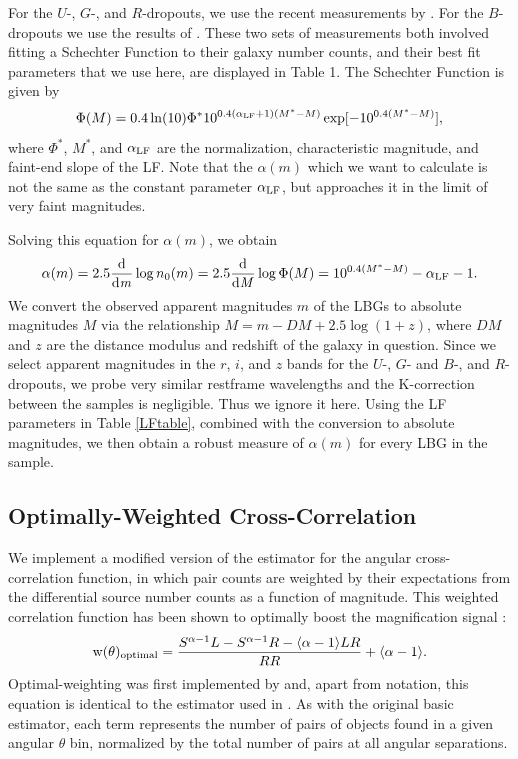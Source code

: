 For the $U$-, $G$-, and $R$-dropouts, we use the recent measurements by \citet{vanderBurg10}. For the $B$-dropouts we use the results of \citet{Sawicki06}. These two sets of measurements both involved fitting a Schechter Function \citep{Schechter76} to their galaxy number counts, and their best fit parameters that we use here, are displayed in Table 1.  The Schechter Function is given by
\begin{equation}
\Phi(M)=0.4\ln(10)\Phi^\ast10^{0.4(\alpha_{\rm LF}+1)(M^\ast-M)} \exp [-10^{0.4(M^\ast-M)}],
\end{equation}
where $\Phi^\ast$, $M^\ast$, and $\alpha_{\rm LF}$ are the normalization, characteristic magnitude, and faint-end slope of the \ac{LF}.  Note that the $\alpha(m)$ which we want to calculate is not the same as the constant parameter $\alpha_{\rm LF}$, but approaches it in the limit of very faint magnitudes.

Solving this equation for $\alpha(m)$, we obtain
\begin{equation}
\alpha(m) = 2.5 \frac{\mathrm d}{\mathrm d \it m} \log n_0(m)= 2.5 \frac{\mathrm d}{\mathrm d \it M} \log \Phi(M) = 10^{0.4(M^\ast-M)}-\alpha_{\rm LF}-1.
\end{equation}
We convert the observed apparent magnitudes $m$ of the \ac{LBG}s to absolute magnitudes $M$ via the relationship $M = m - DM + 2.5 \log (1+z)$, where $DM$ and $z$ are the distance modulus and redshift of the galaxy in question. Since we select apparent magnitudes in the $r$, $i$, and $z$ bands for the $U$-, $G$- and $B$-, and $R$-dropouts, we probe very similar restframe wavelengths and the K-correction between the samples is negligible.  Thus we ignore it here. Using the \ac{LF} parameters in Table \ref{LFtable}, combined with the conversion to absolute magnitudes, we then obtain a robust measure of $\alpha(m)$ for every \ac{LBG} in the sample. 

\subsection{Optimally-Weighted Cross-Correlation}
We implement a modified version of the \citet{LandySzalay93} estimator for the angular cross-correlation function, in which pair counts are weighted by their expectations from the differential source number counts as a function of magnitude.  This weighted correlation function has been shown to optimally boost the magnification signal \citep{Menard03}:    
\begin{equation}
\mathrm{w}(\theta)_{\rm optimal}=\frac{S^{\alpha-1} L - S^{\alpha-1} R - \langle \alpha-1 \rangle LR}{RR} + \langle \alpha-1 \rangle .
\end{equation}
Optimal-weighting was first implemented by \citet{Scranton05} and, apart from notation, this equation is identical to the estimator used in \citet{Hildebrandt09b}.  As with the original basic estimator, each term represents the number of pairs of objects found in a given angular $\theta$ bin, normalized by the total number of pairs at all angular separations.  

